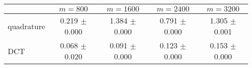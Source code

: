 \centering
\renewcommand{\arraystretch}{1.2}
\begin{tabular}{@{}lcccc@{}}
\toprule
 & $m=800$ & $m=1600$ & $m=2400$ & $m=3200$\\
\midrule
quadrature & 0.219 $\pm$ 0.000 & 1.384 $\pm$ 0.000 & 0.791 $\pm$ 0.000 & 1.305 $\pm$ 0.001 \\
DCT & 0.068 $\pm$ 0.020 & 0.091 $\pm$ 0.000 & 0.123 $\pm$ 0.000 & 0.153 $\pm$ 0.000 \\
\bottomrule
\end{tabular}
